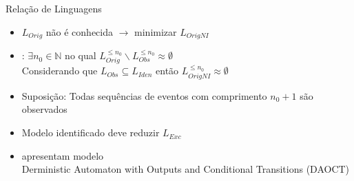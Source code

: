 \begin{frame}{Relação de Linguagens}
\begin{itemize}
\item $L_{Orig}$ não é conhecida \pause $\rightarrow$ minimizar $L_{OrigNI}$ \pause \\
\item \cite{klein2005fault}:  $\exists n_0\in\mathbb{N}$ no qual
  $L_{Orig}^{\leq n_0}\backslash L_{Obs}^{\leq n_0}\approx \emptyset $  \pause \\
Considerando que $L_{Obs}\subseteq L_{Iden}$ então  $L_{OrigNI}^{\leq n_0}\approx
\emptyset$  \pause
\item Suposição: Todas sequências de eventos com comprimento $n_0 + 1$ são observados  \pause
\item Modelo identificado deve reduzir $L_{Exc}$ \pause
  \item \cite{moreira2018enhanced} apresentam modelo \\Derministic Automaton with
    Outputs and Conditional Transitions (DAOCT) 
\end{itemize}

\end{frame}

